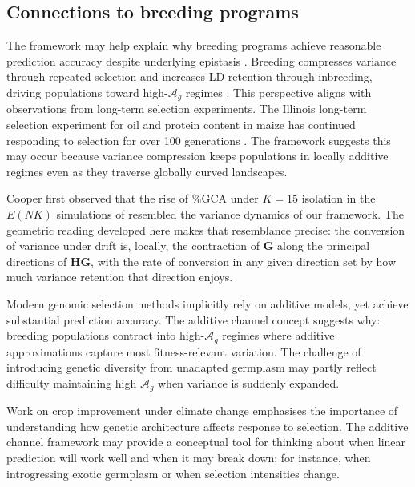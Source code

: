 \documentclass[9pt,twocolumn,twoside,lineno]{gsajnl}
\newcommand{\mat}[1]{\mathbf{#1}}
\newcommand{\Ag}{\ensuremath{\mathcal{A}_{g}}\xspace}
\begin{document}
\subsection{Connections to breeding programs}

The framework may help explain why breeding programs achieve reasonable prediction accuracy despite underlying epistasis \citep{Dudley2007, Dudley2009}. Breeding compresses variance through repeated selection and increases LD retention through inbreeding, driving populations toward high-\Ag regimes \citep{Technow2021, CooperMessina2021}. This perspective aligns with observations from long-term selection experiments. The Illinois long-term selection experiment for oil and protein content in maize has continued responding to selection for over 100 generations \citep{Dudley2007}. The framework suggests this may occur because variance compression keeps populations in locally additive regimes even as they traverse globally curved landscapes. 

Cooper first observed that the rise of \%GCA under $K = 15$ isolation in the $E(NK)$ simulations of \citet{Technow2021} resembled the variance dynamics of our framework. The geometric reading developed here makes that resemblance precise: the conversion of variance under drift is, locally, the contraction of $\mat{G}$ along the principal directions of $\mat{H}\mat{G}$, with the rate of conversion in any given direction set by how much variance retention that direction enjoys.

Modern genomic selection methods \citep{Meuwissen2001, VanRaden2008} implicitly rely on additive models, yet achieve substantial prediction accuracy. The additive channel concept suggests why: breeding populations contract into high-\Ag regimes where additive approximations capture most fitness-relevant variation. The challenge of introducing genetic diversity from unadapted germplasm \citep{Jordan2011, Sanchez2023} may partly reflect difficulty maintaining high \Ag when variance is suddenly expanded. 

Work on crop improvement under climate change \citep{Messina2023, CooperMessina2021} emphasises the importance of understanding how genetic architecture affects response to selection. The additive channel framework may provide a conceptual tool for thinking about when linear prediction will work well and when it may break down; for instance, when introgressing exotic germplasm or when selection intensities change.
\end{document}
